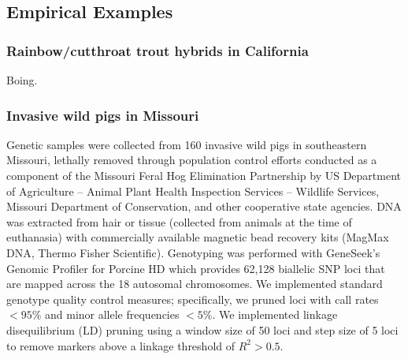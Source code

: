 {\begin{figure}
\caption[\permcap]{\permcap}
\end{figure}

\subsection*{Empirical Examples}

\subsubsection*{Rainbow/cutthroat trout hybrids in California}

Boing.

\subsubsection*{Invasive wild pigs in Missouri}

Genetic samples were collected from 160 invasive wild pigs in
southeastern Missouri, lethally removed through population control efforts conducted
as a component of the Missouri Feral Hog Elimination Partnership
by US Department of Agriculture – Animal Plant Health Inspection Services – Wildlife Services, Missouri Department of Conservation,
and other cooperative state agencies.
DNA was extracted from hair or tissue (collected from animals at the time of euthanasia) with
commercially available magnetic bead recovery kits (MagMax DNA, Thermo Fisher Scientific).
Genotyping was performed with GeneSeek’s Genomic Profiler for Porcine HD which provides
62,128 biallelic SNP loci that are mapped across the 18 autosomal chromosomes.
We implemented standard genotype quality control measures; specifically, we pruned loci with
call rates $<95\%$ and minor allele frequencies $<5\%$.
We implemented linkage disequilibrium (LD) pruning using a window size of 50 loci and step size
of 5 loci to remove markers above a linkage threshold of $R^2 > 0.5$.

}

